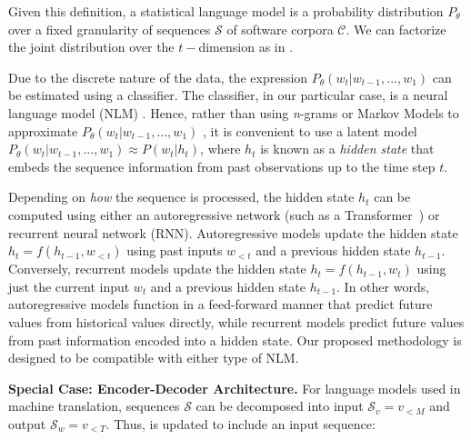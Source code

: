 Given this definition, a statistical language model is a probability distribution $P_{\theta}$ over a fixed granularity of sequences $\mathcal{S}$ of software corpora $\mathcal{C}$. We can factorize the joint distribution over the $t-$dimension as in . 


Due to the discrete nature of the data, the expression $P_{\theta}(w_t | w_{t-1},...,w_1 )$ can be estimated using a classifier. The classifier, in our particular case, is a neural language model (NLM) \citep{Bengio2003AModel}. Hence, rather than using \textit{n}-grams or Markov Models to approximate $P_{\theta}(w_t | w_{t-1},...,w_1 )$ \citep{Karampatsis2020Open-VocabularyAbstract}, it is convenient to use a latent model $P_{\theta}(w_t | w_{t-1},...,w_1 ) \approx P(w_t | h_t )$, where $h_t$ is known as a \textit{hidden state} that embeds the sequence information from past observations up to the time step $t$.

Depending on \textit{how} the sequence is processed, the hidden state $h_t$ can be computed using either an autoregressive network (\ie such as a Transformer~\citep{vaswani2017transformers}) or recurrent neural network (RNN). Autoregressive models update the hidden state $h_t = f(h_{t-1}, w_{<t})$ using past inputs $w_{<t}$ and a previous hidden state $h_{t-1}$. Conversely, recurrent models update the hidden state $h_t = f(h_{t-1}, w_{t})$ using just the current input $w_{t}$ and a previous hidden state $h_{t-1}$. In other words, autoregressive models function in a feed-forward manner that predict future values from historical values directly, while recurrent models predict future values from past information encoded into a hidden state. 
Our proposed \codeSeqRational methodology is designed to be compatible with either type of NLM.

\textbf{Special Case: Encoder-Decoder Architecture.} For language models used in machine translation, sequences $\mathcal{S}$ can be decomposed into input $\mathcal{S}_v = v_{<M}$ and output $\mathcal{S}_w = v_{<T}$. Thus,  is updated to include an input sequence:

